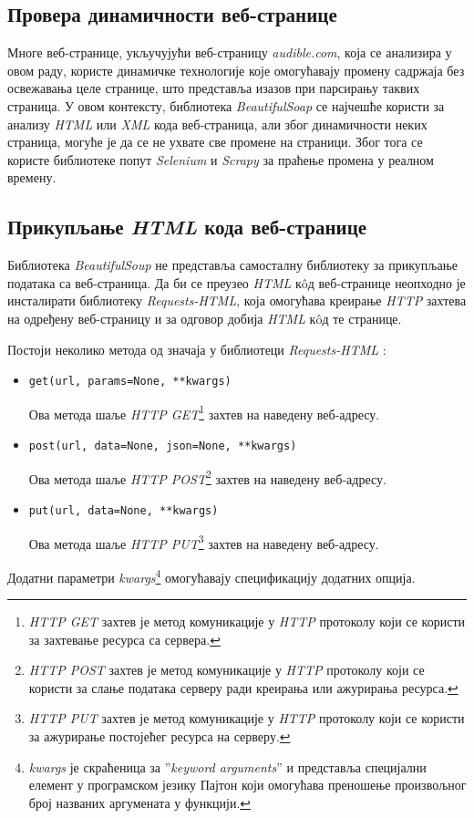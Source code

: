 \documentclass[12pt,oneside]{memoir}
\begin{document}
\subsection{Провера динамичности веб-странице}
Многе веб-странице, укључујући веб-страницу \textit{audible.com}, која се анализира у овом раду, користе динамичке технологије које омогућавају промену садржаја без освежавања целе странице, што представља изазов при парсирању таквих страница. У овом контексту, библиотека \textit{BeautifulSoap} се најчешће користи за анализу \textit{HTML} или \textit{XML} кода веб-страница, али због динамичности неких страница, могуће је да се не ухвате све промене на страници. Због тога се користе библиотеке попут \textit{Selenium} \cite{selenium} и \textit{Scrapy} \cite{scrapy} за праћење промена у реалном времену.

\subsection{Прикупљање \textit{HTML} кода веб-странице}
Библиотека \textit{BeautifulSoup} не представља самосталну библиотеку за прикупљање података са веб-страница. Да би се преузео \textit{HTML} кôд веб-странице неопходно је инсталирати библиотеку \textit{Requests-HTML}, која омогућава креирање \textit{HTTP} захтева на одређену веб-страницу и за одговор добија \textit{HTML} кôд те странице. 

Постоји неколико метода од значаја у библиотеци \textit{Requests-HTML} \cite{WebScrapingWithPython}:
\begin{itemize}
    \item \begin{verbatim}get(url, params=None, **kwargs) \end{verbatim}
    Ова метода шаље \textit{HTTP GET}\footnote{\textit{HTTP GET} захтев је метод комуникације у \textit{HTTP} протоколу који се користи за захтевање ресурса са сервера.} захтев на наведену веб-адресу. 
  \item \begin{verbatim}post(url, data=None, json=None, **kwargs)\end{verbatim}
    Ова метода шаље \textit{HTTP POST}\footnote{\textit{HTTP POST} захтев је метод комуникације у \textit{HTTP} протоколу који се користи за слање података серверу ради креирања или ажурирања ресурса.} захтев на наведену веб-адресу. 
  \item \begin{verbatim}put(url, data=None, **kwargs)\end{verbatim}
    Ова метода шаље \textit{HTTP PUT}\footnote{\textit{HTTP PUT} захтев је метод комуникације у \textit{HTTP} протоколу који се користи за ажурирање постојећег ресурса на серверу.} захтев на наведену веб-адресу. 
\end{itemize}
Додатни параметри \textit{kwargs}\footnote{\textit{kwargs} је скраћеница за ”\textit{keyword arguments}” и представља специјални елемент у програмском језику Пајтон који омогућава преношење произвољног број названих аргумената у функцији.} омогућавају спецификацију додатних опција.
 
\end{document}
